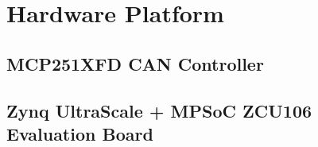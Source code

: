 \section{Hardware Platform}
\label{cha:ver:sec:Hardware_Platform}

\subsection{MCP251XFD CAN Controller}




\subsection{Zynq UltraScale + MPSoC ZCU106 Evaluation Board}
